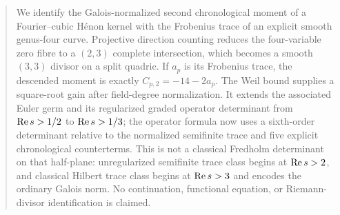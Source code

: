 \begin{abstract}
We identify the Galois-normalized second chronological moment of a
Fourier--cubic H\'enon kernel with the Frobenius trace of an explicit smooth
genus-four curve.  Projective direction counting reduces the four-variable
zero fibre to a \((2,3)\) complete intersection, which becomes a smooth
\((3,3)\) divisor on a split quadric.  If \(a_p\) is its Frobenius trace, the
descended moment is exactly \(C_{p,2}=-14-2a_p\).  The Weil bound supplies a
square-root gain after field-degree normalization.  It extends the associated
Euler germ and its regularized graded operator determinant from
\(\RePart s>1/2\) to \(\RePart s>1/3\); the operator formula now uses a
sixth-order determinant relative to the normalized semifinite trace and five
explicit chronological counterterms.  This is not a classical Fredholm
determinant on that half-plane: unregularized semifinite trace class begins at
\(\RePart s>2\), and classical Hilbert trace class begins at
\(\RePart s>3\) and encodes the ordinary Galois norm.  No continuation,
functional equation, or Riemann-divisor identification is claimed.
\end{abstract}
